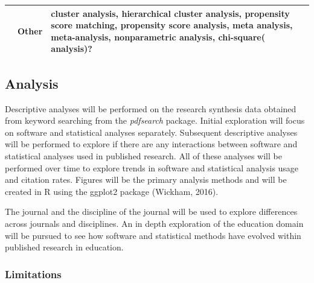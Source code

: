 \documentclass[
  english,
  ,man]{apa7}
\begin{document}
\begin{table}
\begin{tabularx}{\linewidth}{llX}
                                    & Other           & cluster analysis, hierarchical cluster analysis, propensity score matching, propensity score analysis, meta analysis, meta-analysis, nonparametric analysis, chi-square( analysis)?                                                                                                                                             \\
\bottomrule

\end{tabularx}
\end{table}

\hypertarget{analysis}{%
\subsection{Analysis}\label{analysis}}

Descriptive analyses will be performed on the research synthesis data obtained from keyword searching from the \emph{pdfsearch} package. Initial exploration will focus on software and statistical analyses separately. Subsequent descriptive analyses will be performed to explore if there are any interactions between software and statistical analyses used in published research. All of these analyses will be performed over time to explore trends in software and statistical analysis usage and citation rates. Figures will be the primary analysis methods and will be created in R using the ggplot2 package (Wickham, 2016).

The journal and the discipline of the journal will be used to explore differences across journals and disciplines. An in depth exploration of the education domain will be pursued to see how software and statistical methods have evolved within published research in education.

\hypertarget{limitations}{%
\subsubsection{Limitations}\label{limitations}}
\end{document}
